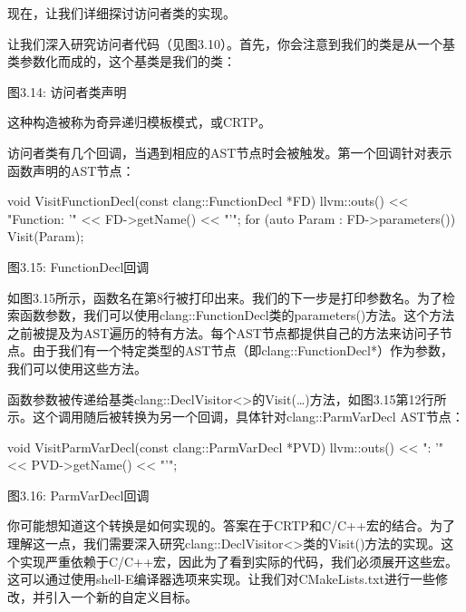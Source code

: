 现在，让我们详细探讨访问者类的实现。


让我们深入研究访问者代码（见图3.10）。首先，你会注意到我们的类是从一个基类参数化而成的，这个基类是我们的类：

\begin{cpp}
class Visitor : public clang::DeclVisitor<Visitor> {
\end{cpp}

\begin{center}
图3.14: 访问者类声明
\end{center}

这种构造被称为奇异递归模板模式，或CRTP。

访问者类有几个回调，当遇到相应的AST节点时会被触发。第一个回调针对表示函数声明的AST节点：

\begin{cpp}
void VisitFunctionDecl(const clang::FunctionDecl *FD) {
  llvm::outs() << "Function: '" << FD->getName() << "'\n";
  for (auto Param : FD->parameters()) {
    Visit(Param);
  }
}
\end{cpp}

\begin{center}
图3.15: FunctionDecl回调
\end{center}

如图3.15所示，函数名在第8行被打印出来。我们的下一步是打印参数名。为了检索函数参数，我们可以使用clang::FunctionDecl类的parameters()方法。这个方法之前被提及为AST遍历的特有方法。每个AST节点都提供自己的方法来访问子节点。由于我们有一个特定类型的AST节点（即clang::FunctionDecl*）作为参数，我们可以使用这些方法。

函数参数被传递给基类clang::DeclVisitor<>的Visit(…)方法，如图3.15第12行所示。这个调用随后被转换为另一个回调，具体针对clang::ParmVarDecl AST节点：

\begin{cpp}
void VisitParmVarDecl(const clang::ParmVarDecl *PVD) {
  llvm::outs() << "\tParameter: '" << PVD->getName() << "'\n";
}
\end{cpp}

\begin{center}
图3.16: ParmVarDecl回调
\end{center}

你可能想知道这个转换是如何实现的。答案在于CRTP和C/C++宏的结合。为了理解这一点，我们需要深入研究clang::DeclVisitor<>类的Visit()方法的实现。这个实现严重依赖于C/C++宏，因此为了看到实际的代码，我们必须展开这些宏。这可以通过使用shell-E编译器选项来实现。让我们对CMakeLists.txt进行一些修改，并引入一个新的自定义目标。

